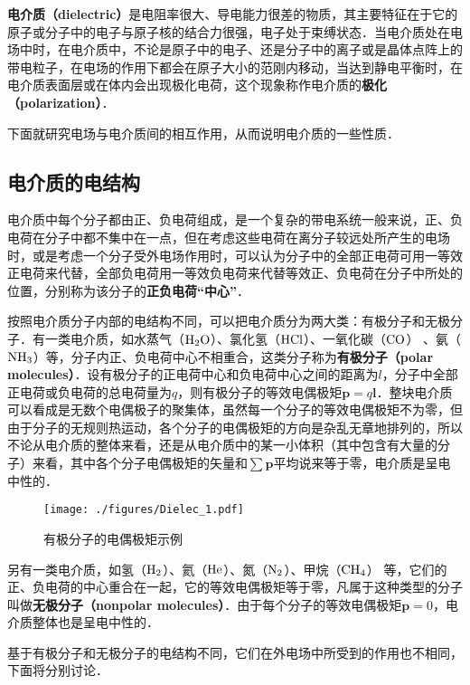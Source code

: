 
\textbf{电介质（dielectric）}是电阻率很大、导电能力很差的物质，其主要特征在于它的原子或分子中的电子与原子核的结合力很强，电子处于束缚状态．当电介质处在电场中时，在电介质中，不论是原子中的电子、还是分子中的离子或是晶体点阵上的带电粒子，在电场的作用下都会在原子大小的范刚内移动，当达到静电平衡时，在电介质表面层或在体内会出现极化电荷，这个现象称作电介质的\textbf{极化（polarization）}．

下面就研究电场与电介质间的相互作用，从而说明电介质的一些性质．

\subsection{电介质的电结构}

电介质中每个分子都由正、负电荷组成，是一个复杂的带电系统一般来说，正、负电荷在分子中都不集中在一点，但在考虑这些电荷在离分子较远处所产生的电场时，或是考虑一个分子受外电场作用时，可以认为分子中的全部正电荷可用一等效正电荷来代替，全部负电荷用一等效负电荷来代替等效正、负电荷在分子中所处的位置，分别称为该分子的\textbf{正负电荷“中心”}．

按照电介质分子内部的电结构不同，可以把电介质分为两大类：有极分子和无极分子．有一类电介质，如水蒸气（$\rm H_2O$）、氯化氢（$\rm HCl$）、一氧化碳（$\rm CO$） 、氨（$\rm NH_3$）等，分子内正、负电荷中心不相重合，这类分子称为\textbf{有极分子（polar molecules）}．设有极分子的正电荷中心和负电荷中心之间的距离为$l$，分子中全部正电荷或负电荷的总电荷量为$q$，则有极分子的等效电偶极矩$\mathbf p=q\mathbf l$．整块电介质可以看成是无数个电偶极子的聚集体，虽然每一个分子的等效电偶极矩不为零，但由于分子的无规则热运动，各个分子的电偶极矩的方向是杂乱无章地排列的，所以不论从电介质的整体来看，还是从电介质中的某一小体积（其中包含有大量的分子）来看，其中各个分子电偶极矩的矢量和$\sum \mathbf p$平均说来等于零，电介质是呈电中性的．
\begin{figure}[ht]
\centering
\texttt{[image: ./figures/Dielec\_1.pdf]}
\caption{有极分子的电偶极矩示例} \label{Dielec_fig1}
\end{figure}
另有一类电介质，如氢（$\rm H_2$）、氦（$\rm He$）、氮（$\rm N_2$）、甲烷（$\rm CH_4$） 等，它们的正、负电荷的中心重合在一起，它的等效电偶极矩等于零，凡属于这种类型的分子叫做\textbf{无极分子（nonpolar molecules）}．由于每个分子的等效电偶极矩$\mathbf p=0$，电介质整体也是呈电中性的．

基于有极分子和无极分子的电结构不同，它们在外电场中所受到的作用也不相同，下面将分别讨论．

